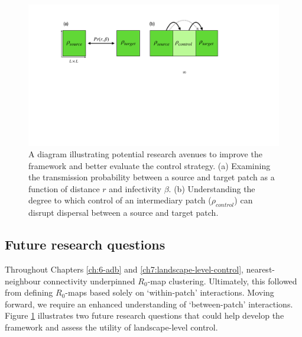 


\begin{figure}
    \centering
    \includegraphics[scale=0.35]{chapter7/figures/figure5-future-reserach.pdf}
    \caption{A diagram illustrating potential research avenues to improve the framework and better evaluate the control strategy. 
    (a) Examining the transmission probability between a source and target patch as a function of distance $r$ and infectivity $\beta$. 
    (b) Understanding the degree to which control of an intermediary patch ($\rho_{control}$) can disrupt dispersal between a source and target patch.}
    \label{fig:future-research}
\end{figure}

\subsection{Future research questions}
\label{sec:future-questions}
Throughout Chapters \ref{ch:6-adb} and \ref{ch7:landscape-level-control}, nearest-neighbour connectivity underpinned $R_0$-map clustering.
Ultimately, this followed from defining $R_0$-maps based solely on `within-patch' interactions. Moving forward, we require an enhanced understanding of `between-patch' interactions.
Figure \ref{fig:future-research} illustrates two future research questions that could help develop the framework and assess the utility of landscape-level control.

